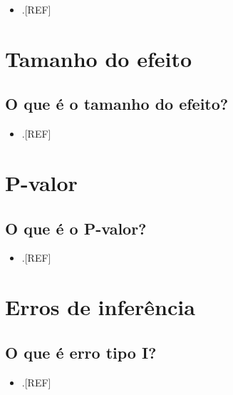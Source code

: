 \documentclass[
]{book}
\providecommand{\tightlist}{%
  \setlength{\itemsep}{0pt}\setlength{\parskip}{0pt}}
\begin{document}
\begin{itemize}
\tightlist
\item
  .{[}REF{]}
\end{itemize}

\hypertarget{tamanho-efeito}{%
\section{Tamanho do efeito}\label{tamanho-efeito}}

\hypertarget{o-que-uxe9-o-tamanho-do-efeito}{%
\subsection{O que é o tamanho do efeito?}\label{o-que-uxe9-o-tamanho-do-efeito}}

\begin{itemize}
\tightlist
\item
  .{[}REF{]}
\end{itemize}

\hypertarget{p-valor}{%
\section{P-valor}\label{p-valor}}

\hypertarget{o-que-uxe9-o-p-valor}{%
\subsection{O que é o P-valor?}\label{o-que-uxe9-o-p-valor}}

\begin{itemize}
\tightlist
\item
  .{[}REF{]}
\end{itemize}

\hypertarget{erros-inferencia}{%
\section{Erros de inferência}\label{erros-inferencia}}

\hypertarget{o-que-uxe9-erro-tipo-i}{%
\subsection{O que é erro tipo I?}\label{o-que-uxe9-erro-tipo-i}}

\begin{itemize}
\tightlist
\item
  .{[}REF{]}
\end{itemize}
\end{document}
